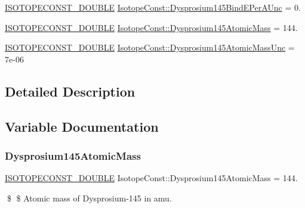 \begin{DoxyCompactItemize}
\mbox{\hyperlink{group___isotope_const-_macros_ga8f45a7272ce02c0b4c65c44636ed719a}{I\+S\+O\+T\+O\+P\+E\+C\+O\+N\+S\+T\+\_\+\+D\+O\+U\+B\+LE}} \mbox{\hyperlink{group___isotope_const-_dysprosium-_dy145_gae3bcaf5d638eab637bc2cc0bcfc604c2}{Isotope\+Const\+::\+Dysprosium145\+Bind\+E\+Per\+A\+Unc}} = 0.
\item 
\mbox{\hyperlink{group___isotope_const-_macros_ga8f45a7272ce02c0b4c65c44636ed719a}{I\+S\+O\+T\+O\+P\+E\+C\+O\+N\+S\+T\+\_\+\+D\+O\+U\+B\+LE}} \mbox{\hyperlink{group___isotope_const-_dysprosium-_dy145_ga71a70163d041d067e9fcc420c4a7e3f2}{Isotope\+Const\+::\+Dysprosium145\+Atomic\+Mass}} = 144.
\item 
\mbox{\hyperlink{group___isotope_const-_macros_ga8f45a7272ce02c0b4c65c44636ed719a}{I\+S\+O\+T\+O\+P\+E\+C\+O\+N\+S\+T\+\_\+\+D\+O\+U\+B\+LE}} \mbox{\hyperlink{group___isotope_const-_dysprosium-_dy145_ga30e57171a339e9ad69b009509b9d4eba}{Isotope\+Const\+::\+Dysprosium145\+Atomic\+Mass\+Unc}} = 7e-\/06
\end{DoxyCompactItemize}


\subsection{Detailed Description}


\subsection{Variable Documentation}
\mbox{\label{group___isotope_const-_dysprosium-_dy145_ga71a70163d041d067e9fcc420c4a7e3f2}} 
\subsubsection{\texorpdfstring{Dysprosium145\+Atomic\+Mass}{Dysprosium145AtomicMass}}
{\footnotesize\ttfamily \mbox{\hyperlink{group___isotope_const-_macros_ga8f45a7272ce02c0b4c65c44636ed719a}{I\+S\+O\+T\+O\+P\+E\+C\+O\+N\+S\+T\+\_\+\+D\+O\+U\+B\+LE}} Isotope\+Const\+::\+Dysprosium145\+Atomic\+Mass = 144.}

\$ \$ Atomic mass of Dysprosium-\/145 in amu. \mbox{\label{group___isotope_const-_dysprosium-_dy145_ga30e57171a339e9ad69b009509b9d4eba}} 
